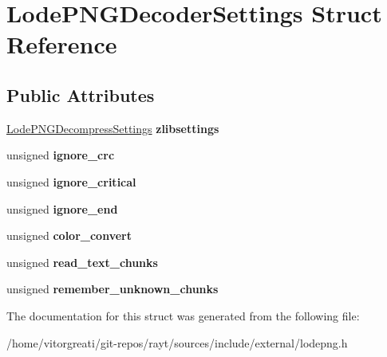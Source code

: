\hypertarget{struct_lode_p_n_g_decoder_settings}{}\section{Lode\+P\+N\+G\+Decoder\+Settings Struct Reference}
\label{struct_lode_p_n_g_decoder_settings}
\subsection*{Public Attributes}
\begin{DoxyCompactItemize}
\item 
\mbox{\label{struct_lode_p_n_g_decoder_settings_a9ae8fef9880bef97a3e932f8ea942ed8}} 
\mbox{\hyperlink{struct_lode_p_n_g_decompress_settings}{Lode\+P\+N\+G\+Decompress\+Settings}} {\bfseries zlibsettings}
\item 
\mbox{\label{struct_lode_p_n_g_decoder_settings_a6390c403d2a5718242337bbbaf15131d}} 
unsigned {\bfseries ignore\+\_\+crc}
\item 
\mbox{\label{struct_lode_p_n_g_decoder_settings_a51c3ce791f1b1d325d5e1f7e18caeeea}} 
unsigned {\bfseries ignore\+\_\+critical}
\item 
\mbox{\label{struct_lode_p_n_g_decoder_settings_aa8f3907b3dcaf09892a752806be2fc59}} 
unsigned {\bfseries ignore\+\_\+end}
\item 
\mbox{\label{struct_lode_p_n_g_decoder_settings_af26f2b29cd338ce4476bee9571a0818a}} 
unsigned {\bfseries color\+\_\+convert}
\item 
\mbox{\label{struct_lode_p_n_g_decoder_settings_aa1212905c3f73d9fffef2c04a220d951}} 
unsigned {\bfseries read\+\_\+text\+\_\+chunks}
\item 
\mbox{\label{struct_lode_p_n_g_decoder_settings_a8775e4fc539dc457916720f52b442f27}} 
unsigned {\bfseries remember\+\_\+unknown\+\_\+chunks}
\end{DoxyCompactItemize}


The documentation for this struct was generated from the following file\+:\begin{DoxyCompactItemize}
\item 
/home/vitorgreati/git-\/repos/rayt/sources/include/external/lodepng.\+h\end{DoxyCompactItemize}
